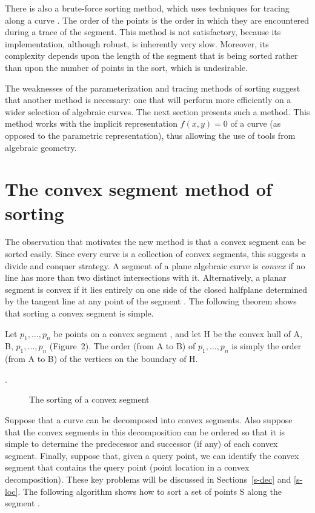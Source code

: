 There is also a brute-force sorting method, which uses techniques for
tracing along a curve \cite{bhhl}.
The order of the points is the order in which they are encountered during
a trace of the segment.
This method is not satisfactory, because its implementation, although robust, is 
inherently very slow.
Moreover, its complexity depends upon the length of the segment that is being
sorted rather than upon the number of points in the sort, which is 
undesirable.

The weaknesses of the parameterization and tracing methods of sorting 
suggest that another method is necessary: one that will perform more
efficiently on a wider selection of algebraic curves.
The next section presents such a method.
This method works with the implicit representation $f(x,y)=0$ of a curve
(as opposed to the parametric representation),
thus allowing the use of tools from algebraic geometry.

\section{The convex segment method of sorting}
\label{co}

The observation that motivates the new method is that 
a convex segment can be sorted easily.
Since every curve is a collection of convex segments,
this suggests a divide and conquer strategy.
A segment of a plane algebraic curve is {\em convex} if no line has more than 
two distinct intersections with it.
Alternatively, a planar segment is convex if it lies entirely on one side of
the closed halfplane determined by the tangent line at any point of
the segment \cite{Do}.
The following theorem shows that sorting a convex segment is simple.

\begin{theorem}
\label{T-s}
Let $p_{1},\ldots,p_{n}$ be points on a convex segment , 
and let H be the convex hull of A, B, $p_{1},\ldots,p_{n}$ (Figure~2).
The order (from A to B) of $p_{1},\ldots,p_{n}$ is simply 
the order (from A to B) of the vertices on the boundary of H.
\end{theorem}
\cite[p. 19]{jj}.
\QED

\begin{figure}[htbp]\vspace{2.25in}\label{2.3}\caption{The sorting of a convex 
segment}\end{figure}  %

Suppose that a curve can be decomposed into convex segments.
Also suppose that the convex segments in this decomposition can be ordered
so that it is simple to determine the predecessor and successor (if any) of each
convex segment.
Finally, suppose that, given a query point, 
we can identify the convex segment 
that contains the query point (point location in a convex decomposition).
These key problems will be discussed in 
Sections~\ref{s-dec} and \ref{s-loc}.
The following algorithm shows how to sort a set of points S 
along the segment .

